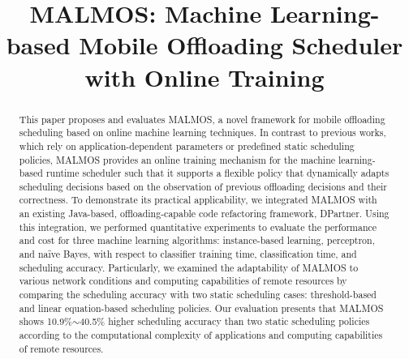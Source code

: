 \documentclass[10pt, conference, compsocconf]{IEEEtran}
\begin{document}


\title{MALMOS: Machine Learning-based Mobile Offloading Scheduler with Online
Training}


\author{
\and
{}
}

\maketitle

\begin{abstract}
%
This paper proposes and evaluates MALMOS, a novel framework for mobile
offloading scheduling based on online machine learning techniques.
%
In contrast to previous works, which rely on application-dependent
parameters or predefined static scheduling policies, MALMOS provides an online
training mechanism for the machine learning-based runtime scheduler such
that it supports a flexible policy that dynamically adapts scheduling decisions
based on the observation of previous offloading decisions and their
correctness.
%
To demonstrate its practical applicability, we integrated MALMOS with an
existing Java-based, offloading-capable code refactoring framework,
DPartner.
%
Using this integration, we performed quantitative experiments to
evaluate the performance and cost for three machine learning
algorithms: instance-based learning, perceptron, and na\"{i}ve Bayes,
with respect to classifier training time, classification time, and
scheduling accuracy.
%
Particularly, we examined the adaptability of MALMOS to various network
conditions and computing capabilities of remote resources by comparing
the scheduling accuracy with two static scheduling cases:
threshold-based and linear equation-based scheduling policies.
%
%
Our evaluation presents that MALMOS shows 10.9\%$\sim$40.5\% higher scheduling
accuracy than two static scheduling policies according to the
computational complexity of applications and computing capabilities of
remote resources.
%
\end{abstract}
\end{document}
